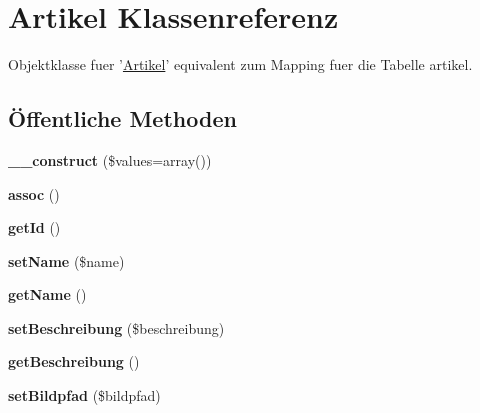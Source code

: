 \hypertarget{classArtikel}{\section{\-Artikel \-Klassenreferenz}
\label{classArtikel}
}


\-Objektklasse fuer '\hyperlink{classArtikel}{\-Artikel}' equivalent zum \-Mapping fuer die \-Tabelle artikel.  


\subsection*{Öffentliche \-Methoden}
\begin{DoxyCompactItemize}
\item 
\hypertarget{classArtikel_a79dc6e027830bb0449f098523c96d5d1}{{\bfseries \-\_\-\-\_\-construct} (\$values=array())}\label{classArtikel_a79dc6e027830bb0449f098523c96d5d1}

\item 
\hypertarget{classArtikel_a15f30f265d0f016165d1b550e8197b2d}{{\bfseries assoc} ()}\label{classArtikel_a15f30f265d0f016165d1b550e8197b2d}

\item 
\hypertarget{classArtikel_a6f3f6b0a8aa1dc76308aa7327ace0725}{{\bfseries get\-Id} ()}\label{classArtikel_a6f3f6b0a8aa1dc76308aa7327ace0725}

\item 
\hypertarget{classArtikel_a8ff04283395691a3c3d321371289efc3}{{\bfseries set\-Name} (\$name)}\label{classArtikel_a8ff04283395691a3c3d321371289efc3}

\item 
\hypertarget{classArtikel_a0771b00f62ca960907a8ea3e4680b973}{{\bfseries get\-Name} ()}\label{classArtikel_a0771b00f62ca960907a8ea3e4680b973}

\item 
\hypertarget{classArtikel_af1e82f057356b080ce94c82948236670}{{\bfseries set\-Beschreibung} (\$beschreibung)}\label{classArtikel_af1e82f057356b080ce94c82948236670}

\item 
\hypertarget{classArtikel_a777571a2f295d5292f9b9ce3d5cac8d2}{{\bfseries get\-Beschreibung} ()}\label{classArtikel_a777571a2f295d5292f9b9ce3d5cac8d2}

\item 
\hypertarget{classArtikel_af9331938501e36c365613dc058f6818f}{{\bfseries set\-Bildpfad} (\$bildpfad)}\label{classArtikel_af9331938501e36c365613dc058f6818f}


\end{DoxyCompactItemize}
